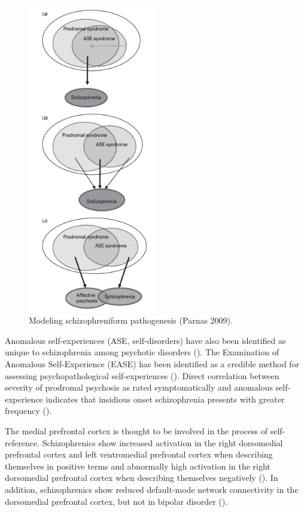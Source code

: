 \documentclass[]{article}
\begin{document}
		\begin{figure}
			\centering
			\includegraphics[width=0.5\textwidth]{graphics/ModelingSchizophreniformPathogenesis}
			\caption{Modeling schizophreniform pathogenesis (Parnas 2009).}
		\end{figure}
		
		Anomalous self-experiences (ASE, self-disorders) have also been identified as unique to schizophrenia among psychotic disorders (\cite{ParnasPhenomenologyanomalousselfexperience2003,ParnasDisorderedSelfSchizophrenia2014}). The Examination of Anomalous Self-Experience (EASE) has been identified as a credible method for assessing psychopathological self-experiences (\cite{ParnasEASEExaminationAnomalous2005,MollerExaminationAnomalousSelfExperience2011}). Direct correlation between severity of prodromal psychosis as rated symptomatically and anomalous self-experience indicates that insidious onset schizophrenia presents with greater frequency (\cite{BrentSelfDisturbancesPossiblePremorbid2014,KorenDisturbancesbasicself2013}).
		
		The medial prefrontal cortex is thought to be involved in the process of self-reference. Schizophrenics show increased activation in the right dorsomedial prefrontal cortex and left ventromedial prefrontal cortex when describing themselves in positive terms and abnormally high activation in the right dorsomedial prefrontal cortex when describing themselves negatively (\cite{PfeiferKnowYouAre2007,ModinosSelfreflectionpsychosispronebrain2011}). In addition, schizophrenics show reduced default-mode network connectivity in the dorsomedial prefrontal cortex, but not in bipolar disorder (\cite{OngurDefaultmodenetwork2010}).
		
\end{document}
